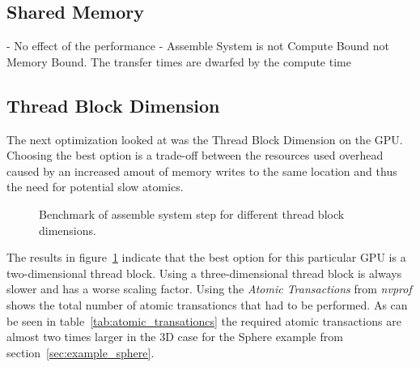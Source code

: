 \documentclass[a4paper,11pt]{kth-mag}
\begin{document}
\subsection{Shared Memory}

- No effect of the performance
- Assemble System is not Compute Bound not Memory Bound. The transfer times are dwarfed by the compute time

\subsection{Thread Block Dimension}

The next optimization looked at was the Thread Block Dimension on the GPU. Choosing the best option is a trade-off between the resources used overhead caused by an increased amout of memory writes to the same location and thus the need for potential slow atomics.

\begin{figure}
  \centering
  \caption{Benchmark of assemble system step for different thread block dimensions.}
  \label{fig:bench_cuda_thread_blocks}
\end{figure}

The results in figure~\ref{fig:bench_cuda_thread_blocks} indicate that the best option for this particular GPU is a two-dimensional thread block. Using a three-dimensional thread block is always slower and has a worse scaling factor. Using the \emph{Atomic Transactions} from \emph{nvprof} shows the total number of atomic transationcs that had to be performed. As can be seen in table~\ref{tab:atomic_transationcs} the required atomic transactions are almost two times larger in the 3D case for the Sphere example from section~\ref{sec:example_sphere}.
\end{document}
